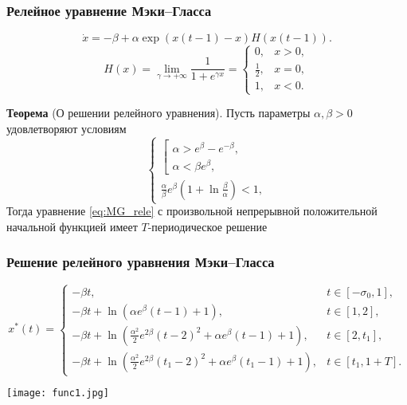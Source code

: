 \begin{frame}
	\frametitle{Релейное уравнение Мэки--Гласса}
	\begin{equation}
		\label{eq:MG_rele}
		\dot{x}=-\beta + \alpha \exp({x(t-1)-x})H(x(t-1)).
	\end{equation}
	\begin{equation}
		\label{eq:H}
		H(x)=\lim\limits_{\gamma\to +\infty}\frac{1}{1 + e^{\gamma x}}=
		\begin{cases}
			0, & x > 0,\\
			\frac{1}{2}, & x = 0,\\
			1, & x < 0.
		\end{cases}
	\end{equation}
	
	\textbf{Теорема} (О решении релейного уравнения).
		Пусть параметры $\alpha,\beta>0$ удовлетворяют условиям
		\begin{equation}
			\label{eq:cond_alpha1}
			\begin{cases}
				\left[
				\begin{array}{ll}
					\alpha > e^{\beta} - e^{-\beta},\\
					\alpha < \beta e^{\beta},
				\end{array}
				\right.\\
				\frac{\alpha}{\beta}e^{\beta}\left(1 + \ln\frac{\beta}{\alpha}\right) < 1,
			\end{cases}
		\end{equation}
		Тогда уравнение \eqref{eq:MG_rele} с произвольной непрерывной положительной начальной функцией имеет $T$-периодическое решение
\end{frame}

\begin{frame}
	\frametitle{Решение релейного уравнения Мэки--Гласса}
	\begin{equation*}
	x^*(t)= 
		\begin{cases}
			-\beta t, & t\in[-\sigma_0, 1],\\
			-\beta t +\ln(\alpha e^{\beta}(t - 1)+1), & t\in[1, 2],\\
			-\beta t + \ln(\frac{\alpha^2}{2}e^{2\beta}(t - 2)^2 + \alpha e^{\beta}(t - 1)+1), & t\in[2, t_1],\\
			-\beta t + \ln(\frac{\alpha^2}{2}e^{2\beta}(t_1 - 2)^2 + \alpha e^{\beta}(t_1 - 1)+1), & t\in[t_1, 1 + T].
		\end{cases}
	\end{equation*}
    
    \begin{center}
    	\texttt{[image: func1.jpg]}
    \end{center}
\end{frame}

